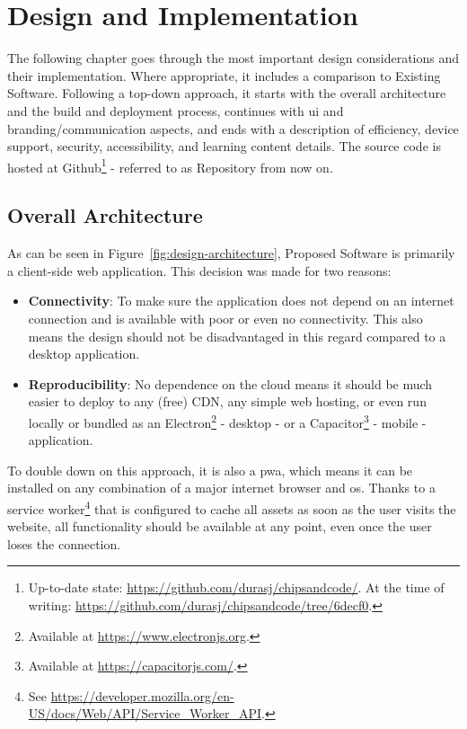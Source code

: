 \chapter{Design and Implementation}

The following chapter goes through the most important design considerations and their implementation.
Where appropriate, it includes a comparison to Existing Software.
Following a top-down approach, it starts with the overall architecture and the build and deployment process, continues with \gls{ui} and branding/communication aspects, and ends with a description of efficiency, device support, security, accessibility, and learning content details.
The source code is hosted at Github\footnote{Up-to-date state: \url{https://github.com/durasj/chipsandcode/}. At the time of writing: \url{https://github.com/durasj/chipsandcode/tree/6decf0}.} - referred to as Repository from now on.

\section{Overall Architecture}

As can be seen in Figure~\ref{fig:design-architecture}, Proposed Software is primarily a client-side web application.
This decision was made for two reasons:

\begin{itemize}
    \item \textbf{Connectivity}: To make sure the application does not depend on an internet connection and is available with poor or even no connectivity. This also means the design should not be disadvantaged in this regard compared to a desktop application.
    \item \textbf{Reproducibility}: No dependence on the cloud means it should be much easier to deploy to any (free) CDN, any simple web hosting, or even run locally or bundled as an Electron\footnote{Available at \url{https://www.electronjs.org}.} - desktop - or a Capacitor\footnote{Available at \url{https://capacitorjs.com/}.} - mobile - application.
\end{itemize}

To double down on this approach, it is also a \gls{pwa}, which means it can be installed on any combination of a major internet browser and \gls{os}.
Thanks to a service worker\footnote{See \url{https://developer.mozilla.org/en-US/docs/Web/API/Service_Worker_API}.} that is configured to cache all assets as soon as the user visits the website, all functionality should be available at any point, even once the user loses the connection.

